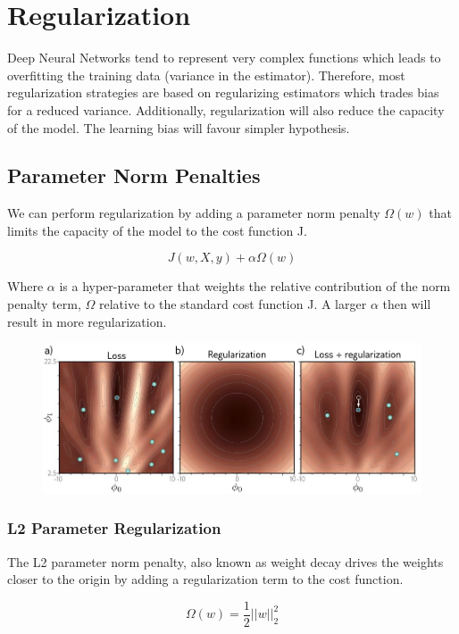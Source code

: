 \chapter{Regularization}

Deep Neural Networks tend to represent very complex functions which leads to overfitting the training data (variance in the estimator). Therefore, most regularization strategies are based on regularizing estimators which trades bias for a reduced variance. Additionally, regularization will also reduce the capacity of the model. The learning bias will favour simpler hypothesis.

\section{Parameter Norm Penalties}

We can perform regularization by adding a parameter norm penalty $\Omega(w)$ that limits the capacity of the model to the cost function J.

$$ J(w, X, y) + \alpha \Omega (w) $$

Where $\alpha$ is a hyper-parameter that weights the relative contribution of the norm penalty term, $\Omega$ relative to the standard cost function J. A larger $\alpha$ then will result in more regularization.

\begin{figure}[h]
    \centering
    \includegraphics[width=12cm]{Images/parameter-norm.jpg}
    \label{fig:parameter-norm}
\end{figure}

\subsection{L2 Parameter Regularization}

The L2 parameter norm penalty, also known as weight decay drives the weights closer to the origin by adding a regularization term to the cost function.

$$ \Omega(w) = \frac{1}{2} || w ||_{2}^{2} $$

